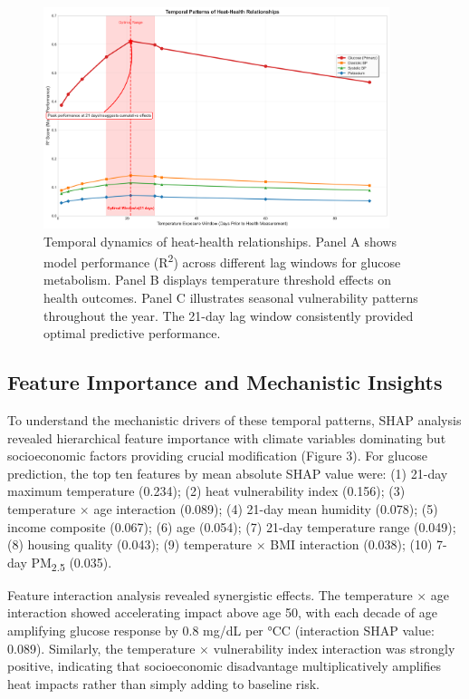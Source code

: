 \documentclass[11pt,a4paper]{article}
\newcommand{\degrees}{°C}
\begin{document}
\begin{figure}[H]
\centering
\includegraphics[width=0.9\textwidth]{heat_analysis_optimized/analysis/Figure2_TemporalPatterns_Fixed.png}
\caption{Temporal dynamics of heat-health relationships. Panel A shows model performance (R\textsuperscript{2}) across different lag windows for glucose metabolism. Panel B displays temperature threshold effects on health outcomes. Panel C illustrates seasonal vulnerability patterns throughout the year. The 21-day lag window consistently provided optimal predictive performance.}
\label{fig:temporal_patterns}
\end{figure}

\subsection{Feature Importance and Mechanistic Insights}

To understand the mechanistic drivers of these temporal patterns, SHAP analysis revealed hierarchical feature importance with climate variables dominating but socioeconomic factors providing crucial modification (Figure 3). For glucose prediction, the top ten features by mean absolute SHAP value were: (1) 21-day maximum temperature (0.234); (2) heat vulnerability index (0.156); (3) temperature $\times$ age interaction (0.089); (4) 21-day mean humidity (0.078); (5) income composite (0.067); (6) age (0.054); (7) 21-day temperature range (0.049); (8) housing quality (0.043); (9) temperature $\times$ BMI interaction (0.038); (10) 7-day PM\textsubscript{2.5} (0.035).

Feature interaction analysis revealed synergistic effects. The temperature $\times$ age interaction showed accelerating impact above age 50, with each decade of age amplifying glucose response by 0.8 mg/dL per \degrees C (interaction SHAP value: 0.089). Similarly, the temperature $\times$ vulnerability index interaction was strongly positive, indicating that socioeconomic disadvantage multiplicatively amplifies heat impacts rather than simply adding to baseline risk.
\end{document}
